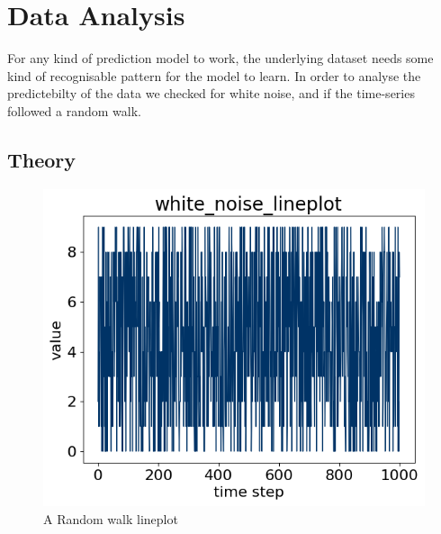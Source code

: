 \section{Data Analysis}
\label{section:Data:DataAnalysis}

For any kind of prediction model to work, the underlying dataset needs some kind of recognisable pattern for
the model to learn.
In order to analyse the predictebilty of the data we checked for white noise, and if the time-series followed a random walk.

\subsection*{Theory}

\begin{figure}[h!]
  \centering
  \includegraphics[width=\textwidth]{./figs/code_generated/data_exploration/white_noise_lineplot.png}
  \hfill
  \caption{A Random walk lineplot}
  \label{fig:dataset:white_noise}
\end{figure}
